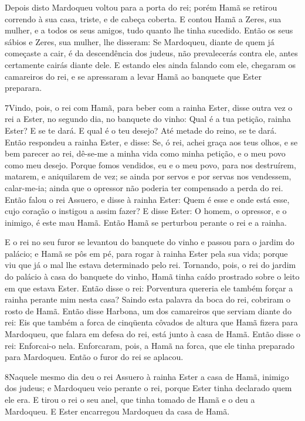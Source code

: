 Depois disto Mardoqueu voltou para a porta do rei; porém Hamã se
retirou correndo à sua casa, triste, e de cabeça coberta. E
contou Hamã a Zeres, sua mulher, e a todos os seus amigos, tudo
quanto lhe tinha sucedido. Então os seus sábios e Zeres, sua mulher,
lhe disseram: Se Mardoqueu, diante de quem já começaste a cair, é da
descendência dos judeus, não prevalecerás contra ele, antes
certamente cairás diante dele. E estando eles ainda falando
com ele, chegaram os camareiros do rei, e se apressaram a levar Hamã
ao banquete que Ester preparara.

\medskip

\lettrine{7} Vindo, pois, o rei com Hamã, para beber com a
rainha Ester, disse outra vez o rei a Ester, no segundo dia, no
banquete do vinho: Qual é a tua petição, rainha Ester? E se te dará.
E qual é o teu desejo? Até metade do reino, se te dará. Então
respondeu a rainha Ester, e disse: Se, ó rei, achei graça aos teus
olhos, e se bem parecer ao rei, dê-se-me a minha vida como minha
petição, e o meu povo como meu desejo. Porque fomos vendidos, eu
e o meu povo, para nos destruírem, matarem, e aniquilarem de vez; se
ainda por servos e por servas nos vendessem, calar-me-ia; ainda que
o opressor não poderia ter compensado a perda do rei. Então
falou o rei Assuero, e disse à rainha Ester: Quem é esse e onde está
esse, cujo coração o instigou a assim fazer? E disse Ester: O
homem, o opressor, e o inimigo, é este mau Hamã. Então Hamã se
perturbou perante o rei e a rainha.

E o rei no seu furor se levantou do banquete do vinho e passou
para o jardim do palácio; e Hamã se pôs em pé, para rogar à rainha
Ester pela sua vida; porque viu que já o mal lhe estava determinado
pelo rei. Tornando, pois, o rei do jardim do palácio à casa do
banquete do vinho, Hamã tinha caído prostrado sobre o leito em que
estava Ester. Então disse o rei: Porventura quereria ele também
forçar a rainha perante mim nesta casa? Saindo esta palavra da boca
do rei, cobriram o rosto de Hamã. Então disse Harbona, um dos
camareiros que serviam diante do rei: Eis que também a forca de
cinqüenta côvados de altura que Hamã fizera para Mardoqueu, que
falara em defesa do rei, está junto à casa de Hamã. Então disse o
rei: Enforcai-o nela. Enforcaram, pois, a Hamã na forca, que
ele tinha preparado para Mardoqueu. Então o furor do rei se aplacou.

\medskip

\lettrine{8} Naquele mesmo dia deu o rei Assuero à rainha
Ester a casa de Hamã, inimigo dos judeus; e Mardoqueu veio perante o
rei, porque Ester tinha declarado quem ele era. E tirou o rei o
seu anel, que tinha tomado de Hamã e o deu a Mardoqueu. E Ester
encarregou Mardoqueu da casa de Hamã.

